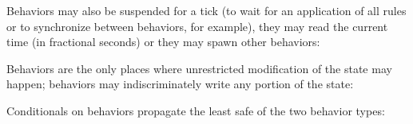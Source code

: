 Behaviors may also be suspended for a tick (to wait for an application of all rules or to synchronize between behaviors, for example), they may read the current time (in fractional seconds) or they may spawn other behaviors:


Behaviors are the only places where unrestricted modification of the state may happen; behaviors may indiscriminately write any portion of the state:


Conditionals on behaviors propagate the least safe of the two behavior types:

